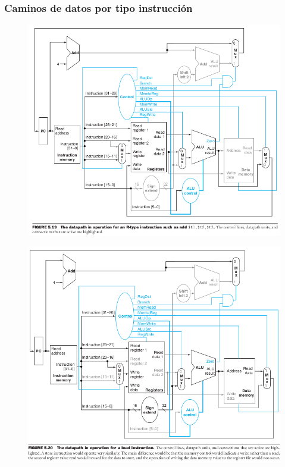 \documentclass{article}
\begin{document}
\newpage
\subsubsection{Caminos de datos por tipo instrucción}

\begin{figure}[h!]
    \includegraphics[width=\linewidth]{imagenes/pipeline/inst-add.png}
\end{figure}
\newpage
\begin{figure}[h!]
    \includegraphics[width=\linewidth]{imagenes/pipeline/inst-load.png}
\end{figure}
\end{document}
